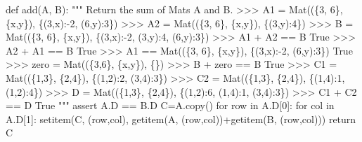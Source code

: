 \documentclass[
  letterpaper,
  DIV=11,
  numbers=noendperiod]{scrartcl}
\newenvironment{Shaded}{\begin{snugshade}}{\end{snugshade}}
\newcommand{\CommentTok}[1]{\textcolor[rgb]{0.37,0.37,0.37}{#1}}
\newcommand{\ControlFlowTok}[1]{\textcolor[rgb]{0.00,0.23,0.31}{#1}}
\newcommand{\DecValTok}[1]{\textcolor[rgb]{0.68,0.00,0.00}{#1}}
\newcommand{\KeywordTok}[1]{\textcolor[rgb]{0.00,0.23,0.31}{#1}}
\newcommand{\NormalTok}[1]{\textcolor[rgb]{0.00,0.23,0.31}{#1}}
\newcommand{\OperatorTok}[1]{\textcolor[rgb]{0.37,0.37,0.37}{#1}}
\begin{document}
\begin{Shaded}
\begin{Highlighting}[numbers=left,,]
\KeywordTok{def}\NormalTok{ add(A, B):}
    \CommentTok{"""}
\CommentTok{    Return the sum of Mats A and B.}
\CommentTok{    \textgreater{}\textgreater{}\textgreater{} A1 = Mat((\{3, 6\}, \{\textquotesingle{}x\textquotesingle{},\textquotesingle{}y\textquotesingle{}\}), \{(3,\textquotesingle{}x\textquotesingle{}):{-}2, (6,\textquotesingle{}y\textquotesingle{}):3\})}
\CommentTok{    \textgreater{}\textgreater{}\textgreater{} A2 = Mat((\{3, 6\}, \{\textquotesingle{}x\textquotesingle{},\textquotesingle{}y\textquotesingle{}\}), \{(3,\textquotesingle{}y\textquotesingle{}):4\})}
\CommentTok{    \textgreater{}\textgreater{}\textgreater{} B = Mat((\{3, 6\}, \{\textquotesingle{}x\textquotesingle{},\textquotesingle{}y\textquotesingle{}\}), \{(3,\textquotesingle{}x\textquotesingle{}):{-}2, (3,\textquotesingle{}y\textquotesingle{}):4, (6,\textquotesingle{}y\textquotesingle{}):3\})}
\CommentTok{    \textgreater{}\textgreater{}\textgreater{} A1 + A2 == B}
\CommentTok{    True}
\CommentTok{    \textgreater{}\textgreater{}\textgreater{} A2 + A1 == B}
\CommentTok{    True}
\CommentTok{    \textgreater{}\textgreater{}\textgreater{} A1 == Mat((\{3, 6\}, \{\textquotesingle{}x\textquotesingle{},\textquotesingle{}y\textquotesingle{}\}), \{(3,\textquotesingle{}x\textquotesingle{}):{-}2, (6,\textquotesingle{}y\textquotesingle{}):3\})}
\CommentTok{    True}
\CommentTok{    \textgreater{}\textgreater{}\textgreater{} zero = Mat((\{3,6\}, \{\textquotesingle{}x\textquotesingle{},\textquotesingle{}y\textquotesingle{}\}), \{\})}
\CommentTok{    \textgreater{}\textgreater{}\textgreater{} B + zero == B}
\CommentTok{    True}
\CommentTok{    \textgreater{}\textgreater{}\textgreater{} C1 = Mat((\{1,3\}, \{2,4\}), \{(1,2):2, (3,4):3\})}
\CommentTok{    \textgreater{}\textgreater{}\textgreater{} C2 = Mat((\{1,3\}, \{2,4\}), \{(1,4):1, (1,2):4\})}
\CommentTok{    \textgreater{}\textgreater{}\textgreater{} D = Mat((\{1,3\}, \{2,4\}), \{(1,2):6, (1,4):1, (3,4):3\})}
\CommentTok{    \textgreater{}\textgreater{}\textgreater{} C1 + C2 == D}
\CommentTok{    True}
\CommentTok{    """}
    \ControlFlowTok{assert}\NormalTok{ A.D }\OperatorTok{==}\NormalTok{ B.D}
\NormalTok{    C}\OperatorTok{=}\NormalTok{A.copy()}
    \ControlFlowTok{for}\NormalTok{ row }\KeywordTok{in}\NormalTok{ A.D[}\DecValTok{0}\NormalTok{]:}
        \ControlFlowTok{for}\NormalTok{ col }\KeywordTok{in}\NormalTok{ A.D[}\DecValTok{1}\NormalTok{]:}
\NormalTok{            setitem(C, (row,col), getitem(A, (row,col))}\OperatorTok{+}\NormalTok{getitem(B, (row,col)))}
    \ControlFlowTok{return}\NormalTok{ C}
    

\end{Highlighting}
\end{Shaded}
\end{document}
